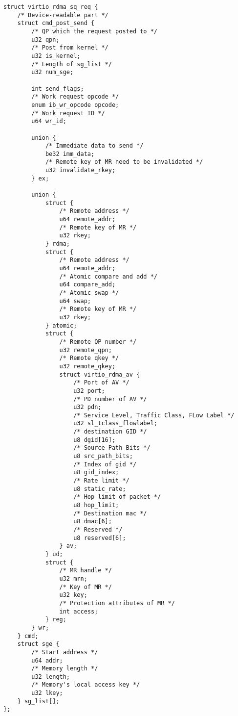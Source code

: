 \begin{lstlisting}
struct virtio_rdma_sq_req {
    /* Device-readable part */
    struct cmd_post_send {
        /* QP which the request posted to */
        u32 qpn;
        /* Post from kernel */
        u32 is_kernel;
        /* Length of sg_list */
        u32 num_sge;
    
        int send_flags;
        /* Work request opcode */
        enum ib_wr_opcode opcode;
        /* Work request ID */
        u64 wr_id;
    
        union {
            /* Immediate data to send */
            be32 imm_data;
            /* Remote key of MR need to be invalidated */
            u32 invalidate_rkey;
        } ex;
        
        union {
            struct {
                /* Remote address */
                u64 remote_addr;
                /* Remote key of MR */
                u32 rkey;
            } rdma;
            struct {
                /* Remote address */
                u64 remote_addr;
                /* Atomic compare and add */
                u64 compare_add;
                /* Atomic swap */
                u64 swap;
                /* Remote key of MR */
                u32 rkey;
            } atomic;
            struct {
                /* Remote QP number */
                u32 remote_qpn;
                /* Remote qkey */
                u32 remote_qkey;
                struct virtio_rdma_av {
                    /* Port of AV */
                    u32 port;
                    /* PD number of AV */
                    u32 pdn;
                    /* Service Level, Traffic Class, FLow Label */
                    u32 sl_tclass_flowlabel;
                    /* destination GID */
                    u8 dgid[16];
                    /* Source Path Bits */
                    u8 src_path_bits;
                    /* Index of gid */
                    u8 gid_index;
                    /* Rate limit */
                    u8 static_rate;
                    /* Hop limit of packet */
                    u8 hop_limit;
                    /* Destination mac */
                    u8 dmac[6];
                    /* Reserved */
                    u8 reserved[6];
                } av;
            } ud;
            struct {
                /* MR handle */
                u32 mrn;
                /* Key of MR */
                u32 key;
                /* Protection attributes of MR */
                int access;
            } reg;
        } wr;
    } cmd;
    struct sge {
        /* Start address */
        u64 addr;
        /* Memory length */
        u32 length;
        /* Memory's local access key */
        u32 lkey;
    } sg_list[];
};
\end{lstlisting}

